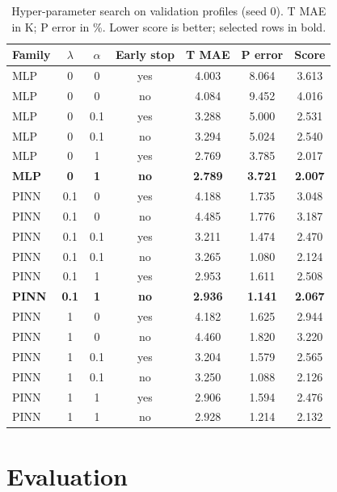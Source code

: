 \documentclass[11pt,a4paper]{article}
\begin{document}
\begin{table}[t]
\centering\small
\caption{Hyper-parameter search on validation profiles (seed 0). T MAE in K; P error in \%. Lower score is better; selected rows in bold.}\label{tab:tuning}
\begin{tabular}{lcccccc}
\toprule
Family & $\lambda$ & $\alpha$ & Early stop & T MAE & P error & Score\\
\midrule
MLP & 0 & 0 & yes & 4.003 & 8.064 & 3.613\\
MLP & 0 & 0 & no & 4.084 & 9.452 & 4.016\\
MLP & 0 & 0.1 & yes & 3.288 & 5.000 & 2.531\\
MLP & 0 & 0.1 & no & 3.294 & 5.024 & 2.540\\
MLP & 0 & 1 & yes & 2.769 & 3.785 & 2.017\\
\textbf{MLP} & \textbf{0} & \textbf{1} & \textbf{no} & \textbf{2.789} & \textbf{3.721} & \textbf{2.007}\\
\midrule
PINN & 0.1 & 0 & yes & 4.188 & 1.735 & 3.048\\
PINN & 0.1 & 0 & no & 4.485 & 1.776 & 3.187\\
PINN & 0.1 & 0.1 & yes & 3.211 & 1.474 & 2.470\\
PINN & 0.1 & 0.1 & no & 3.265 & 1.080 & 2.124\\
PINN & 0.1 & 1 & yes & 2.953 & 1.611 & 2.508\\
\textbf{PINN} & \textbf{0.1} & \textbf{1} & \textbf{no} & \textbf{2.936} & \textbf{1.141} & \textbf{2.067}\\
PINN & 1 & 0 & yes & 4.182 & 1.625 & 2.944\\
PINN & 1 & 0 & no & 4.460 & 1.820 & 3.220\\
PINN & 1 & 0.1 & yes & 3.204 & 1.579 & 2.565\\
PINN & 1 & 0.1 & no & 3.250 & 1.088 & 2.126\\
PINN & 1 & 1 & yes & 2.906 & 1.594 & 2.476\\
PINN & 1 & 1 & no & 2.928 & 1.214 & 2.132\\
\bottomrule
\end{tabular}
\end{table}

\section{Evaluation}\label{sec:eval}
\end{document}
